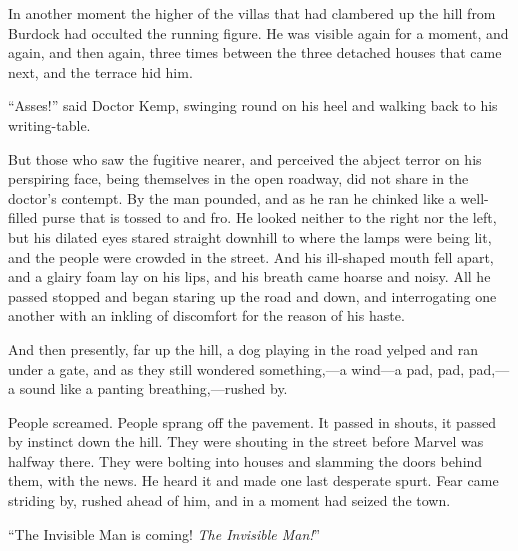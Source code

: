 In another moment the higher of the villas that had clambered up the hill from Burdock had occulted the running figure. He was visible again for a moment, and again, and then again, three times between the three detached houses that came next, and the terrace hid him.

“Asses!” said Doctor Kemp, swinging round on his heel and walking back to his writing-table.

But those who saw the fugitive nearer, and perceived the abject terror on his perspiring face, being themselves in the open roadway, did not share in the doctor’s contempt. By the man pounded, and as he ran he chinked like a well-filled purse that is tossed to and fro. He looked neither to the right nor the left, but his dilated eyes stared straight downhill to where the lamps were being lit, and the people were crowded in the street. And his ill-shaped mouth fell apart, and a glairy foam lay on his lips, and his breath came hoarse and noisy. All he passed stopped and began staring up the road and down, and interrogating one another with an inkling of discomfort for the reason of his haste.

And then presently, far up the hill, a dog playing in the road yelped and ran under a gate, and as they still wondered something,—a wind—a pad, pad, pad,—a sound like a panting breathing,—rushed by.

People screamed. People sprang off the pavement. It passed in shouts, it passed by instinct down the hill. They were shouting in the street before Marvel was halfway there. They were bolting into houses and slamming the doors behind them, with the news. He heard it and made one last desperate spurt. Fear came striding by, rushed ahead of him, and in a moment had seized the town.

“The Invisible Man is coming! \emph{The Invisible Man!}”